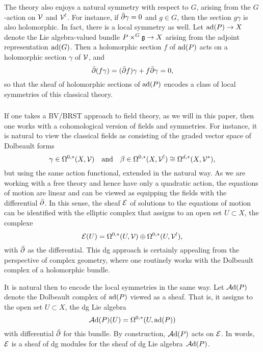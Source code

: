 The theory also enjoys a natural symmetry with respect to $G$,
arising from the $G$-action on $\mathcal V$ and $\mathcal V^!$.
For instance, if $\Bar{\partial} \gamma = 0$ and $g \in G$, then the section $g \gamma$ is also holomorphic.
In fact, there is a local symmetry as well.
Let ${\rm ad}(P) \to X$ denote the Lie algebra-valued bundle $P \times^G \mathfrak g \to X$ arising from the adjoint representation ${\rm ad}(G)$.
Then a holomorphic section $f$ of ${\rm ad}(P)$ acts on a holomorphic section $\gamma$ of $\mathcal V$,
and 
\[
\Bar{\partial}(f \gamma) =  (\Bar{\partial} f) \gamma + f \Bar{\partial} \gamma = 0,
\]
so that the sheaf of holomorphic sections of ${\rm ad}(P)$ encodes a class of local symmetries of this classical theory.

\subsubsection{}

If one takes a BV/BRST approach to field theory, as we will in this paper,
then one works with a cohomological version of fields and symmetries.
For instance, it is natural to view the classical fields as consisting of the graded vector space of Dolbeault forms
\[
\gamma \in \Omega^{0,*}(X,\mathcal V) \quad \text{and} \quad \beta \in \Omega^{0,*}(X, \mathcal V^!) \cong \Omega^{d,*}(X, \mathcal V^*),
\]
but using the same action functional, extended in the natural way.
As we are working with a free theory and hence have only a quadratic action,
the equations of motion are linear and can be viewed as equipping the fields with the differential $\Bar{\partial}$.
In this sense, the sheaf $\mathcal E$ of solutions to the equations of motion can be identified with the elliptic complex that assigns to an open set $U \subset X$, the complexe
\[
\mathcal E(U) = \Omega^{0,*}(U,\mathcal V) \oplus \Omega^{0,*}(U, \mathcal V^!),
\]
with $\Bar{\partial}$ as the differential.
This dg approach is certainly appealing from the perspective of complex geometry,
where one routinely works with the Dolbeault complex of a holomorphic bundle.

It is natural then to encode the local symmetries in the same way.
Let $\mathcal A{\rm d}(P)$ denote the Dolbeault complex of ${\rm ad}(P)$ viewed as a sheaf.
That is, it assigns to the open set $U \subset X$, the dg Lie algebra 
\[
\mathcal A{\rm d}(P)(U) = \Omega^{0,*}(U,{\rm ad}(P))
\]
with differential $\Bar{\partial}$ for this bundle.
By construction, $\mathcal A{\rm d}(P)$ acts on $\mathcal E$.
In words, $\mathcal E$ is a sheaf of dg modules for the sheaf of dg Lie algebra~$\mathcal A{\rm d}(P)$.

\subsubsection{}

